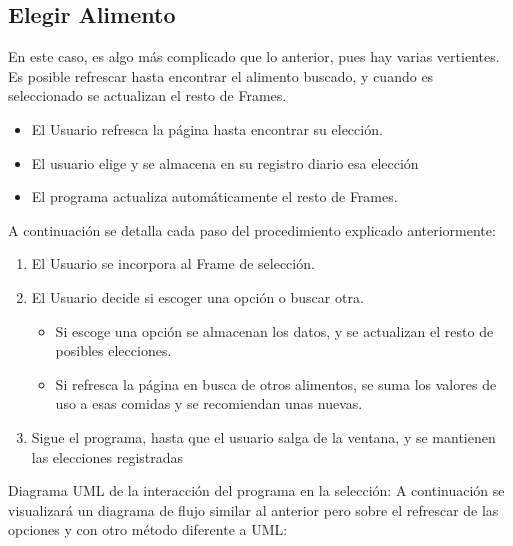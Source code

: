 \subsection{Elegir Alimento}
En este caso, es algo más complicado que lo anterior, pues hay varias vertientes. Es posible refrescar hasta encontrar el alimento buscado, y cuando es seleccionado se actualizan el resto de Frames.
\begin{itemize}
\item El Usuario refresca la página hasta encontrar su elección. 
\item El usuario elige y se almacena en su registro diario esa elección
\item El programa actualiza automáticamente el resto de Frames.
\end{itemize}
A continuación se detalla cada paso del procedimiento explicado anteriormente:
\begin{enumerate}
\item El Usuario se incorpora al Frame de selección.
\item El Usuario decide si escoger una opción o buscar otra.
\begin{itemize}
\item Si escoge una opción se almacenan los datos, y se actualizan el resto de posibles elecciones.
\item Si refresca la página en busca de otros alimentos, se suma los valores de uso a esas comidas y se recomiendan unas nuevas.
\end{itemize}
\item Sigue el programa, hasta que el usuario salga de la ventana, y se mantienen las elecciones registradas
\end{enumerate}
Diagrama UML de la interacción del programa en la selección:
A continuación se visualizará un diagrama de flujo  similar al anterior pero sobre el refrescar de las opciones y con otro método diferente a UML:

